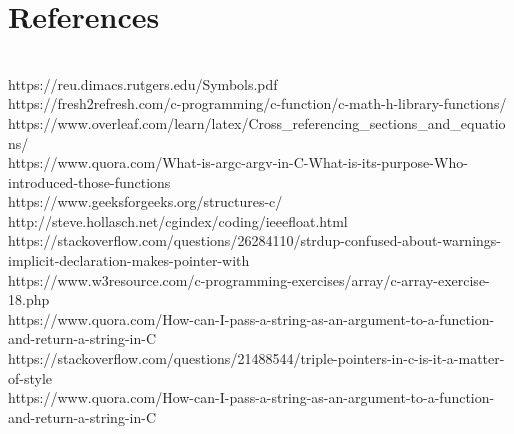 \documentclass[11pt]{report}
\begin{document}
\section{References}
\\ https://reu.dimacs.rutgers.edu/Symbols.pdf
\\ https://fresh2refresh.com/c-programming/c-function/c-math-h-library-functions/
\\ https://www.overleaf.com/learn/latex/Cross\_referencing\_sections\_and\_equations/
\\ https://www.quora.com/What-is-argc-argv-in-C-What-is-its-purpose-Who-introduced-those-functions
\\ https://www.geeksforgeeks.org/structures-c/
\\ http://steve.hollasch.net/cgindex/coding/ieeefloat.html
\\ https://stackoverflow.com/questions/26284110/strdup-confused-about-warnings-implicit-declaration-makes-pointer-with
\\https://www.w3resource.com/c-programming-exercises/array/c-array-exercise-18.php
\\https://www.quora.com/How-can-I-pass-a-string-as-an-argument-to-a-function-and-return-a-string-in-C
\\https://stackoverflow.com/questions/21488544/triple-pointers-in-c-is-it-a-matter-of-style
\\https://www.quora.com/How-can-I-pass-a-string-as-an-argument-to-a-function-and-return-a-string-in-C
\end{document}

